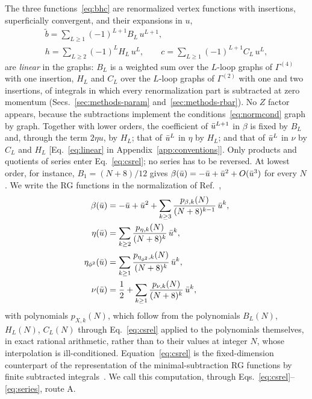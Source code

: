 The three functions~\eqref{eq:bhc} are renormalized vertex functions with insertions, superficially convergent, and
their expansions in $u$,
\begin{gather}
\tilde b=\sum_{L\ge1}(-1)^{L+1}B_L\,u^{L+1},\nonumber\\
h=\sum_{L\ge2}(-1)^L H_L\,u^L,\qquad c=\sum_{L\ge1}(-1)^{L+1}C_L\,u^L,
\label{eq:series}
\end{gather}
are \emph{linear} in the graphs: $B_L$ is a weighted sum over the $L$-loop graphs of $\Gamma^{(4)}$ with one insertion,
$H_L$ and $C_L$ over the $L$-loop graphs of $\Gamma^{(2)}$ with one and two insertions, of integrals in which every
renormalization part is subtracted at zero momentum (Secs.~\ref{sec:methods-param} and~\ref{sec:methods-rbar}). No $Z$ factor
appears, because the subtractions implement the conditions~\eqref{eq:normcond} graph by graph. Together with lower orders, the coefficient of
$\bar u^{L+1}$ in $\beta$ is fixed by $B_L$ and, through the term $2\eta u$, by $H_L$; that of $\bar u^{L}$ in $\eta$
by $H_L$; and that of $\bar u^{L}$ in $\nu$ by $C_L$ and $H_L$ [Eq.~\eqref{eq:linear} in
Appendix~\ref{app:conventions}]. Only products and quotients of series enter Eq.~\eqref{eq:csrel}; no series has to
be reversed. At lowest order, for instance, $B_1=(N+8)/12$ gives $\beta(\bar u)=-\bar u+\bar u^2+O(\bar u^3)$ for every
$N$. We write the RG functions in the normalization of Ref.~\cite{Phi4tools2024},
\begin{align}
\beta(\bar u)&=-\bar u+\bar u^2+\sum_{k\ge3}\frac{p_{\beta,k}(N)}{(N+8)^{k-1}}\,\bar u^{k},\nonumber\\
\eta(\bar u)&=\sum_{k\ge2}\frac{p_{\eta,k}(N)}{(N+8)^{k}}\,\bar u^{k},\label{eq:series-form}\\
\eta_{\phi^2}(\bar u)&=\sum_{k\ge1}\frac{p_{\eta_{\phi^2},k}(N)}{(N+8)^{k}}\,\bar u^{k},\nonumber\\
\nu(\bar u)&=\frac12+\sum_{k\ge1}\frac{p_{\nu,k}(N)}{(N+8)^{k}}\,\bar u^{k},\nonumber
\end{align}
with polynomials $p_{X,k}(N)$, which follow from the polynomials $B_L(N)$, $H_L(N)$, $C_L(N)$ through
Eq.~\eqref{eq:csrel} applied to the polynomials themselves, in exact rational arithmetic, rather than to their values
at integer $N$, whose interpolation is ill-conditioned.
Equation~\eqref{eq:csrel} is the fixed-dimension counterpart of the representation of the minimal-subtraction RG
functions by finite subtracted integrals~\cite{AdzhemyanKompaniets2011,AdzhemyanKompaniets2014}. We call this computation, through
Eqs.~\eqref{eq:csrel}--\eqref{eq:series}, route A.

